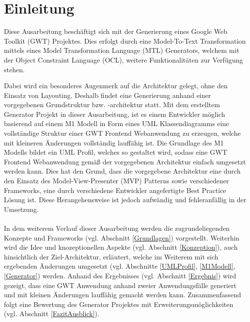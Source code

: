\chapter{Einleitung}
\label{Einleitung}
Diese Ausarbeitung beschäftigt sich mit der Generierung eines Google Web
Toolkit (GWT) Projektes.
Dies erfolgt durch eine Model-To-Text Transformation mittels eines Model
Transformation Language (MTL) Generators, welchem mit der Object Constraint Language (OCL), weitere
Funktionalitäten zur Verfügung stehen. 

Dabei wird ein besonderes Augenmerk auf die Architektur gelegt, ohne den
Einsatz von Layouting. Deshalb findet eine Generierung anhand einer vorgegebenen
Grundstruktur bzw. -architektur statt. Mit dem erstelltem Generator Projekt in
dieser Ausarbeitung, ist es einem Entwickler möglich basierend auf einem M1 Modell in Form eines UML
Klassendiagramms eine vollständige Struktur einer GWT Frontend Webanwendung zu
erzeugen, welche mit kleineren Änderungen vollständig lauffähig ist. Die
Grundlage des M1 Modells bildet ein UML Profil, welches so gestaltet wird,
sodass eine GWT Frontend Webanwendung gemäß der vorgegebenen Architektur einfach
umgesetzt werden kann. Dies hat den Grund, dass die vorgegebene Architektur eine
durch den Einsatz des Model-View-Presenter (MVP) Patterns sowie verschiedener
Frameworks, eine durch verschiedene Entwickler angefertigte \glqq{}Best
Practice\grqq{} Lösung ist. Diese Herangehensweise ist jedoch aufwändig und
fehleranfällig in der Umsetzung. 
\\\\
In dem weiterem Verlauf dieser Ausarbeitung werden die zugrundeliegenden
Konzepte und Frameworks (vgl. Abschnitt \ref{Grundlagen}) vorgestellt. Weiterhin
wird die Idee und knozeptionellen Aspekte (vgl. Abschnitt \ref{Konzeption}),
auch hinsichtlich der Ziel-Architektur, erläutert, welche im Weiterem mit sich
ergebenden Änderungen umgesetzt (vgl. Abschnitte \ref{UMLProfil},
\ref{M1Modell}, \ref{Generator}) werden.
Anhand des Ergebnisses (vgl. Abschnitt \ref{Ergebnis}) wird gezeigt, dass eine
GWT Anwendung anhand zweier Anwendungsfälle generiert und mit kleinen
Änderungen lauffähig gemacht werden kann. Zusammenfassend folgt eine Bewertung
des Generator Projektes mit Erweiterungsmöglichkeiten (vgl. Abschnitt
\ref{FazitAusblick}).
